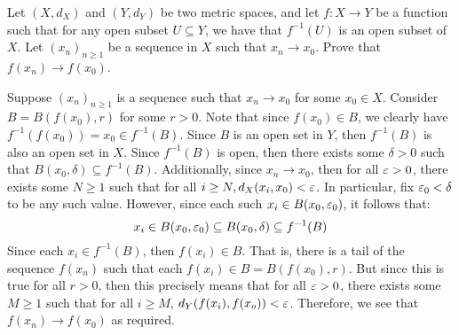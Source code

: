 \documentclass{article}
\begin{document}
\setcounter{subsection}{4}
\setcounter{exr}{10}

\begin{exr}
    Let $ (X, d_{X}) $ and $ (Y, d_{Y}) $ be two metric spaces, and let $ f: X \rightarrow Y $
    be a function such that for any open subset $ U \subseteq Y $, we have that $ f^{-1}(U) $ is an
    open subset of $ X $. \vsp
    Let $ (x_{n})_{n \geq 1} $ be a sequence in $ X $ such that $ x_{n} \rightarrow x_{0} $.
    Prove that $ f(x_{n}) \rightarrow f(x_{0}) $.
\end{exr}

\begin{pf}
    Suppose $ (x_{n})_{n \geq 1} $ is a sequence such that $ x_{n} \rightarrow x_{0} $
    for some $ x_{0} \in X $. \vsp
    Consider $ B = B(f(x_{0}), r) $ for some $ r > 0 $.
    Note that since $ f(x_{0}) \in B $, we clearly have $ f^{-1}(f(x_{0})) = x_{0} \in f^{-1}(B) $.
    Since $ B $ is an open set in $ Y $, then $ f^{-1}(B) $ is also an open set in $ X $. \vsp
    Since $ f^{-1}(B) $ is open, then there exists some $ \delta > 0 $ such that
    $ B(x_{0}, \delta) \subseteq f^{-1}(B) $.
    Additionally, since $ x_{n} \rightarrow x_{0} $, then for all $ \operatorname{\varepsilon} > 0 $, there exists
    some $ N \geq 1 $ such that for all $ i \geq N, d_{X}(x_{i}, x_{0}) < \operatorname{\varepsilon} $.
    In particular, fix $ \operatorname{\varepsilon}_{0} < \delta $ to be any such value.
    However, since each such $ x_{i} \in B(x_{0}, \operatorname{\varepsilon}_{0}) $, it follows that:
    \begin{equation*}
        x_{i} \in B(x_{0}, \operatorname{\varepsilon}_{0}) \subseteq B(x_{0}, \delta) \subseteq f^{-1}(B)
    \end{equation*}
    Since each $ x_{i} \in f^{-1}(B) $, then $ f(x_{i}) \in B $.
    That is, there is a tail of the sequence $ f(x_{n}) $ such that
    each $ f(x_{i}) \in B = B(f(x_{0}), r) $.
    But since this is true for all $ r > 0 $, then this precisely means that for all $ \operatorname{\varepsilon} > 0 $,
    there exists some $ M \geq 1 $ such that for all $ i \geq M $,
    $ d_{Y}(f(x_{i}), f(x_{o})) < \operatorname{\varepsilon} $. \vsp
    Therefore, we see that $ f(x_{n}) \rightarrow f(x_{0}) $ as required.
\end{pf}
\end{document}
